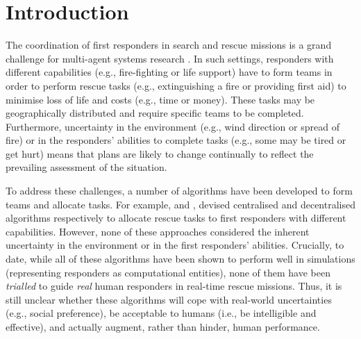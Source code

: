 \section{Introduction}
\noindent The coordination of first responders in search and rescue missions is a grand challenge for multi-agent systems research \cite{kitano:2001}. In such settings, responders with different capabilities (e.g., fire-fighting or life support) have to form teams in order to perform rescue tasks  (e.g., extinguishing a fire or providing first aid) to minimise  loss of life and costs (e.g., time or money). These tasks may be geographically distributed  and require specific teams  to be completed. Furthermore, uncertainty in the environment (e.g., wind direction or spread of fire) or in the responders' abilities to complete tasks (e.g., some may be tired or get hurt) means that plans are likely to change continually to reflect the prevailing assessment of the situation. 

To address these challenges, a number of algorithms  have been developed to form teams and allocate tasks. For example, \cite{ramchurn:etal:2010,Scerri2005} and \cite{Chapman2009}, devised centralised and decentralised algorithms respectively to allocate rescue tasks to first responders with different capabilities. However, none of these approaches considered the inherent uncertainty in the environment or in the first responders' abilities. Crucially, to date, while all of these algorithms have been shown to perform well in simulations (representing responders as computational entities), none of them have been \emph{trialled} to guide \emph{real} human responders in real-time rescue missions. Thus, it is still unclear whether these algorithms will cope with real-world uncertainties (e.g., social preference), be acceptable to humans (i.e., be intelligible and effective), and actually augment, rather than hinder,  human performance.

